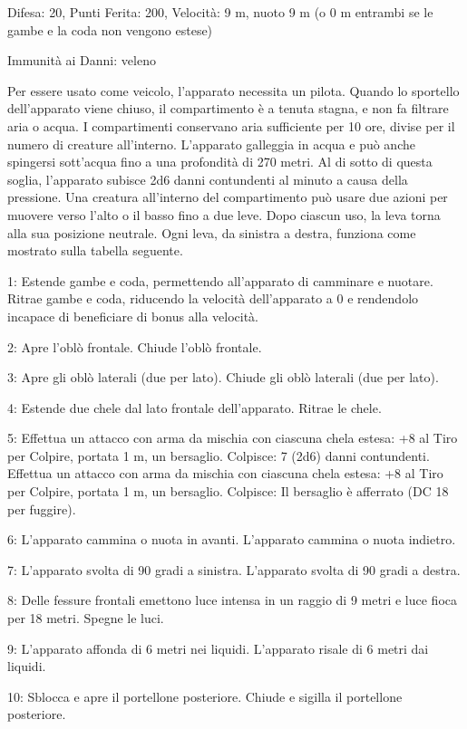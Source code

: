 \begin{multicols}{2}
Difesa: 20, Punti Ferita: 200, Velocità: 9 m, nuoto 9 m (o 0 m entrambi se le gambe e la coda non vengono estese)

Immunità ai Danni: veleno

Per essere usato come veicolo, l'apparato necessita un pilota. Quando lo sportello dell'apparato viene chiuso, il compartimento è a tenuta stagna, e non fa filtrare aria o acqua. I compartimenti conservano aria sufficiente per 10 ore, divise per il numero di creature all'interno. L'apparato galleggia in acqua e può anche spingersi sott'acqua fino a una profondità di 270 metri. Al di sotto di questa soglia, l'apparato subisce 2d6 danni contundenti al minuto a causa della pressione. Una creatura all'interno del compartimento può usare due azioni per muovere verso l'alto o il basso fino a due leve. Dopo ciascun uso, la leva torna alla sua posizione neutrale. Ogni leva, da sinistra a destra, funziona come mostrato sulla tabella seguente.

1: Estende gambe e coda, permettendo all'apparato di camminare e nuotare. Ritrae gambe e coda, riducendo la velocità dell'apparato a 0 e rendendolo incapace di beneficiare di bonus alla velocità.

2: Apre l'oblò frontale. Chiude l'oblò frontale.

3: Apre gli oblò laterali (due per lato). Chiude gli oblò laterali (due per lato).

4: Estende due chele dal lato frontale dell'apparato. Ritrae le chele.

5: Effettua un attacco con arma da mischia con ciascuna chela estesa: +8 al Tiro per Colpire, portata 1 m, un bersaglio. Colpisce: 7 (2d6) danni contundenti. Effettua un attacco con arma da mischia con ciascuna chela estesa: +8 al Tiro per Colpire, portata 1 m, un bersaglio. Colpisce: Il bersaglio è afferrato (DC 18 per fuggire).

6: L'apparato cammina o nuota in avanti. L'apparato cammina o nuota indietro.

7: L'apparato svolta di 90 gradi a sinistra. L'apparato svolta di 90 gradi a destra.

8: Delle fessure frontali emettono luce intensa in un raggio di 9 metri e luce fioca per 18 metri. Spegne le luci.

9: L'apparato affonda di 6 metri nei liquidi. L'apparato risale di 6 metri dai liquidi.

10: Sblocca e apre il portellone posteriore. Chiude e sigilla il portellone posteriore.


\end{multicols}
